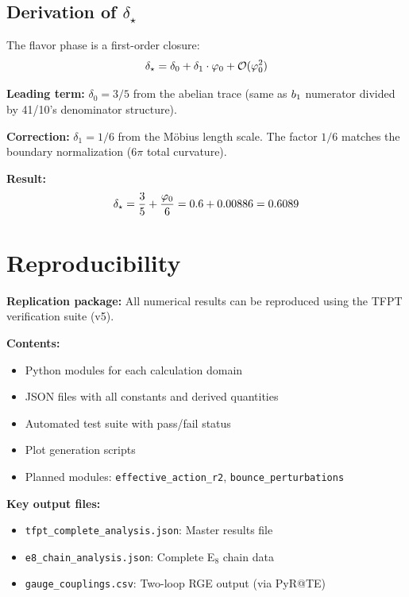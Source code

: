 \subsection{Derivation of $\delta_\star$}

The flavor phase is a first-order closure:
\begin{equation}
    \delta_\star = \delta_0 + \delta_1 \cdot \varphi_0 + \mathcal{O}(\varphi_0^2)
\end{equation}

\textbf{Leading term:} $\delta_0 = 3/5$ from the abelian trace (same as $b_1$ numerator 
divided by 41/10's denominator structure).

\textbf{Correction:} $\delta_1 = 1/6$ from the M\"obius length scale. The factor $1/6$ 
matches the boundary normalization ($6\pi$ total curvature).

\textbf{Result:}
\begin{equation}
    \delta_\star = \frac{3}{5} + \frac{\varphi_0}{6} = 0.6 + 0.00886 = 0.6089
\end{equation}

\section{Reproducibility}
\label{app:repro}

\textbf{Replication package:} All numerical results can be reproduced using the 
TFPT verification suite (v5).

\textbf{Contents:}
\begin{itemize}[leftmargin=1.5em, topsep=2pt, itemsep=1pt]
    \item Python modules for each calculation domain
    \item JSON files with all constants and derived quantities
    \item Automated test suite with pass/fail status
    \item Plot generation scripts
    \item Planned modules: \texttt{effective\_action\_r2}, \texttt{bounce\_perturbations}
\end{itemize}

\textbf{Key output files:}
\begin{itemize}[leftmargin=1.5em, topsep=2pt, itemsep=1pt]
    \item \texttt{tfpt\_complete\_analysis.json}: Master results file
    \item \texttt{e8\_chain\_analysis.json}: Complete E$_8$ chain data
    \item \texttt{gauge\_couplings.csv}: Two-loop RGE output (via PyR@TE)
\end{itemize}

